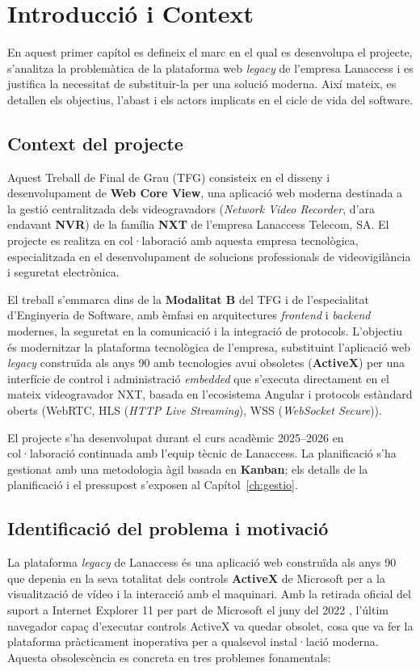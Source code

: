 \chapter{Introducció i Context}
\label{ch:introduccio}

En aquest primer capítol es defineix el marc en el qual es desenvolupa el projecte, s'analitza la problemàtica de la plataforma web \textit{legacy} de l'empresa Lanaccess i es justifica la necessitat de substituir-la per una solució moderna. Així mateix, es detallen els objectius, l'abast i els actors implicats en el cicle de vida del software.

\section{Context del projecte}
Aquest Treball de Final de Grau (TFG) consisteix en el disseny i desenvolupament de \textbf{Web Core View}, una aplicació web moderna destinada a la gestió centralitzada dels videogravadors (\textit{Network Video Recorder}, d'ara endavant \textbf{NVR}) de la família \textbf{NXT} de l'empresa Lanaccess Telecom, SA. El projecte es realitza en col·laboració amb aquesta empresa tecnològica, especialitzada en el desenvolupament de solucions professionals de videovigilància i seguretat electrònica.

El treball s'emmarca dins de la \textbf{Modalitat B} del TFG i de l'especialitat d'Enginyeria de Software, amb èmfasi en arquitectures \textit{frontend} i \textit{backend} modernes, la seguretat en la comunicació i la integració de protocols. L'objectiu és modernitzar la plataforma tecnològica de l'empresa, substituint l'aplicació web \textit{legacy} construïda als anys 90 amb tecnologies avui obsoletes (\textbf{ActiveX}) per una interfície de control i administració \textit{embedded} que s'executa directament en el mateix videogravador NXT, basada en l'ecosistema Angular i protocols estàndard oberts (WebRTC, HLS (\textit{HTTP Live Streaming}), WSS (\textit{WebSocket Secure})).

El projecte s'ha desenvolupat durant el curs acadèmic 2025--2026 en col·laboració continuada amb l'equip tècnic de Lanaccess. La planificació s'ha gestionat amb una metodologia àgil basada en \textbf{Kanban}; els detalls de la planificació i el pressupost s'exposen al Capítol~\ref{ch:gestio}.

\section{Identificació del problema i motivació}
La plataforma \textit{legacy} de Lanaccess és una aplicació web construïda als anys 90 que depenia en la seva totalitat dels controls \textbf{ActiveX} de Microsoft per a la visualització de vídeo i la interacció amb el maquinari. Amb la retirada oficial del suport a Internet Explorer 11 per part de Microsoft el juny del 2022 \cite{microsoft_ie11_eol}, l'últim navegador capaç d'executar controls ActiveX va quedar obsolet, cosa que va fer la plataforma pràcticament inoperativa per a qualsevol instal·lació moderna. Aquesta obsolescència es concreta en tres problemes fonamentals:


